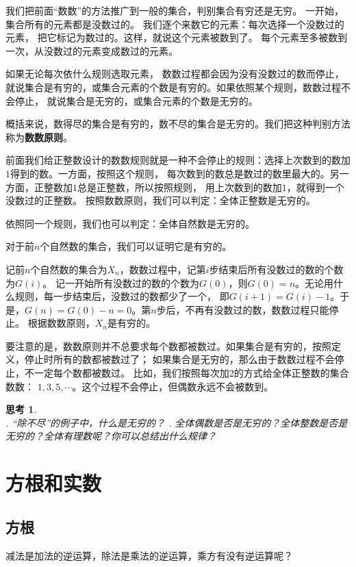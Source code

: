 \documentclass[12pt,UTF8]{ctexbook}
\newtheorem{sk}{思考}[section]
\begin{document}
我们把前面“数数”的方法推广到一般的集合，判别集合有穷还是无穷。
一开始，集合所有的元素都是没数过的。
我们逐个来数它的元素：每次选择一个没数过的元素，
把它标记为数过的。这样，就说这个元素被数到了。
每个元素至多被数到一次，从没数过的元素变成数过的元素。

如果无论每次依什么规则选取元素，
数数过程都会因为没有没数过的数而停止，就说集合是有穷的，或集合元素的个数是有穷的。如果依照某个规则，数数过程不会停止，
就说集合是无穷的，或集合元素的个数是无穷的。

概括来说，数得尽的集合是有穷的，数不尽的集合是无穷的。我们把这种判别方法称为\textbf{数数原则}。

前面我们给正整数设计的数数规则就是一种不会停止的规则：选择上次数到的数加$1$得到的数。一方面，按照这个规则，
每次数到的数总是数过的数里最大的。另一方面，正整数加$1$总是正整数，所以按照规则，
用上次数到的数加$1$，就得到一个没数过的正整数。
按照数数原则，我们可以判定：全体正整数是无穷的。

依照同一个规则，我们也可以判定：全体自然数是无穷的。

对于前$n$个自然数的集合，我们可以证明它是有穷的。

记前$n$个自然数的集合为$X_n$，数数过程中，记第$i$步结束后所有没数过的数的个数为$G(i)$。
记一开始所有没数过的数的个数为$G(0)$，则$G(0) = n$。无论用什么规则，每一步结束后，没数过的数都少了一个，
即$G(i+1) = G(i) - 1$。于是，$G(n) = G(0) - n = 0$。第$n$步后，不再有没数过的数，数数过程只能停止。
根据数数原则，$X_n$是有穷的。

要注意的是，数数原则并不总要求每个数都被数过。如果集合是有穷的，按照定义，停止时所有的数都被数过了；
如果集合是无穷的，那么由于数数过程不会停止，不一定每个数都被数过。
比如，我们按照每次加$2$的方式给全体正整数的集合数数：
$1,3,5,\cdots$。这个过程不会停止，但偶数永远不会被数到。

\begin{sk}
    \mbox{}\\
    . “除不尽”的例子中，什么是无穷的？
    . 全体偶数是否是无穷的？全体整数是否是无穷的？全体有理数呢？你可以总结出什么规律？
\end{sk}

\chapter{方根和实数}

\section{方根}
减法是加法的逆运算，除法是乘法的逆运算，乘方有没有逆运算呢？
\end{document}
